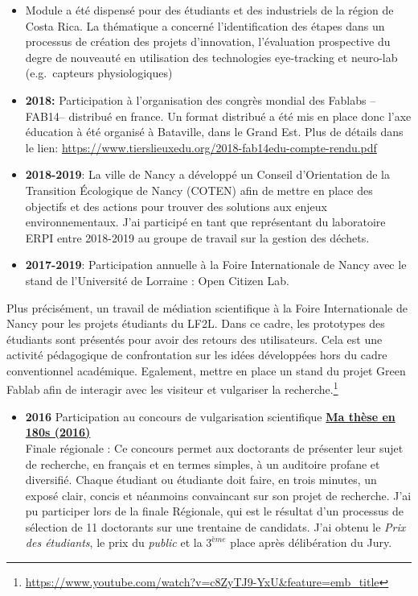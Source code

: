 \documentclass[
  11pt,
]{article}
\providecommand{\tightlist}{%
  \setlength{\itemsep}{0pt}\setlength{\parskip}{0pt}}\usepackage{longtable,booktabs,array}
\begin{document}
\begin{itemize}
\item
  Module a été dispensé pour des étudiants et des industriels de la
  région de Costa Rica. La thématique a concerné l'identification des
  étapes dans un processus de création des projets d'innovation,
  l'évaluation prospective du degre de nouveauté en utilisation des
  technologies eye-tracking et neuro-lab (e.g.~capteurs physiologiques)
\item
  \textbf{2018:} Participation à l'organisation des congrès mondial des
  Fablabs --FAB14-- distribué en france. Un format distribué a été mis
  en place donc l'axe éducation à été organisé à Bataville, dans le
  Grand Est. Plus de détails dans le lien:
  \url{https://www.tierslieuxedu.org/2018-fab14edu-compte-rendu.pdf}
\item
  \textbf{2018-2019}: La ville de Nancy a développé un Conseil
  d'Orientation de la Transition Écologique de Nancy (COTEN) afin de
  mettre en place des objectifs et des actions pour trouver des
  solutions aux enjeux environnementaux. J'ai participé en tant que
  représentant du laboratoire ERPI entre 2018-2019 au groupe de travail
  sur la gestion des déchets.
\item
  \textbf{2017-2019}: Participation annuelle à la Foire Internationale
  de Nancy avec le stand de l'Université de Lorraine : Open Citizen Lab.
\end{itemize}

Plus précisément, un travail de médiation scientifique à la Foire
Internationale de Nancy pour les projets étudiants du LF2L. Dans ce
cadre, les prototypes des étudiants sont présentés pour avoir des
retours des utilisateurs. Cela est une activité pédagogique de
confrontation sur les idées développées hors du cadre conventionnel
académique. Egalement, mettre en place un stand du projet Green Fablab
afin de interagir avec les visiteur et vulgariser la
recherche.\footnote{\url{https://www.youtube.com/watch?v=c8ZyTJ9-YxU&feature=emb_title}}

\begin{itemize}
\tightlist
\item
  \textbf{2016} Participation au concours de vulgarisation scientifique
  \href{http://videos.univ-lorraine.fr/index.php?act=view&id=3475}{\textbf{Ma thèse en 180s (2016)}}\\
  Finale régionale : Ce concours permet aux doctorants de présenter leur
  sujet de recherche, en français et en termes simples, à un auditoire
  profane et diversifié. Chaque étudiant ou étudiante doit faire, en
  trois minutes, un exposé clair, concis et néanmoins convaincant sur
  son projet de recherche. J'ai pu participer lors de la finale
  Régionale, qui est le résultat d'un processus de sélection de 11
  doctorants sur une trentaine de candidats. J'ai obtenu le
  \textit{Prix des étudiants}, le prix du \textit{public} et la
  \(3^{ème}\) place après délibération du Jury.
\end{itemize}
\end{document}
